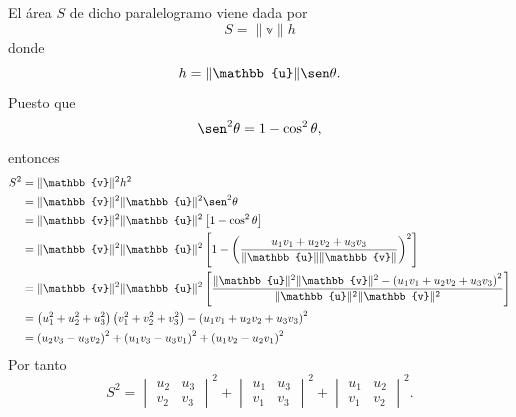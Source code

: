 El área $S$ de dicho paralelogramo viene dada por
$$S = \| \mathbb{v} \| h$$
donde
$$h = \| \mathbb{u} \| \sen \theta.$$
Puesto que
$$\sen ^2 \theta = 1 - \cos ^2 \theta,$$
entonces
\begin{align*}
    S^2 & = \| \mathbb{v} \|^2 h^2 \\
    & = \| \mathbb{v} \|^2 \| \mathbb{u} \|^2 \sen^2 \theta \\
    & = \| \mathbb{v} \|^2 \| \mathbb{u} \|^2 \left[1 - \cos ^2 \theta\right] \\
    & = \| \mathbb{v} \|^2 \| \mathbb{u} \|^2 \left[1-\left(\frac{u_1 v_1 + u_2 v_2 + u_3 v_3}{\| \mathbb{u} \| \| \mathbb{v} \|}\right)^2\right] \\
    & = \| \mathbb{v} \|^2 \| \mathbb{u} \|^2\left[\frac{\| \mathbb{u} \|^2 \| \mathbb{v} \|^2-\left(u_1 v_1 + u_2 v_2 + u_3 v_3\right)^2}{\| \mathbb{u} \|^2 \| \mathbb{v} \|^2}\right] \\
    & =\left(u_1^2 + u_2^2 + u_3^2\right)\left(v_1^2 + v_2^2 + v_3^2\right) - \left(u_1 v_1 + u_2 v_2 + u_3 v_3\right)^2 \\
    & = \left(u_2 v_3 - u_3 v_2\right)^2 + \left(u_1 v_3 - u_3 v_1\right)^2 + \left(u_1 v_2 - u_2 v_1\right)^2
\end{align*}
Por tanto
$$S^2 = \begin{vmatrix}
    u_2 & u_3 \\
    v_2 & v_3
\end{vmatrix}^2 + \begin{vmatrix}
    u_1 & u_3 \\
    v_1 & v_3
\end{vmatrix}^2 + \begin{vmatrix}
    u_1 & u_2 \\
    v_1 & v_2
\end{vmatrix}^2.$$


